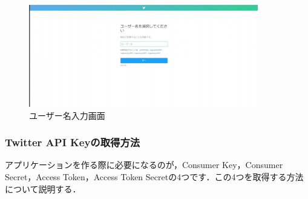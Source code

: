 \begin{enumerate}
\begin{figure}[htb]
\centering
\includegraphics[width=10cm]{09.png}
\caption{ユーザー名入力画面}\label{9}
\end{figure}
\end{enumerate}

\subsubsection{Twitter API Keyの取得方法}
アプリケーションを作る際に必要になるのが，Consumer Key，Consumer Secret，Access Token，Access Token Secretの4つです．この4つを取得する方法について説明する．
